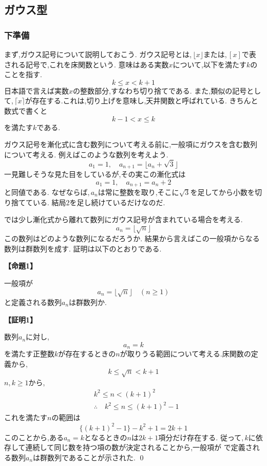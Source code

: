 \subsection{ガウス型}
  \subsubsection{下準備}
    まず,ガウス記号について説明しておこう.
    ガウス記号とは,\,$\lfloor x \rfloor$または,\,$[x]$で表される記号で,これを床関数という.
    意味はある実数$x$について,以下を満たす$k$のことを指す.
    \[
      k \le x < k+1
    \]
    日本語で言えば実数$x$の整数部分,すなわち切り捨てである.
    また,類似の記号として,\,$\lceil x \rceil$が存在する.これは,切り上げを意味し,天井関数と呼ばれている.
    きちんと数式で書くと
    \[
      k-1 < x \le k
    \]
    を満たす$k$である.

    ガウス記号を漸化式に含む数列について考える前に,一般項にガウスを含む数列について考える.
    例えばこのような数列を考えよう.
    \[
      a_1=1,\quad a_{n+1}=\lfloor a_n+\sqrt{3} \rfloor
    \]
    一見難しそうな見た目をしているが,その実この漸化式は
    \[
      a_1=1,\quad a_{n+1}=a_n+2
    \]
    と同値である.
    なぜならば,\,$a_n$は常に整数を取り,そこに$\sqrt{3}$を足してから小数を切り捨てている.
    結局2を足し続けているだけなのだ.

    では少し漸化式から離れて数列にガウス記号が含まれている場合を考える.
    \[
      a_{n}=\lfloor \sqrt{n} \rfloor
    \]
    この数列はどのような数列になるだろうか.
    結果から言えばこの一般項からなる数列は群数列を成す.
    証明は以下のとおりである.

    \noindent \textbf{【命題1】}
    \begin{smallquote}
      一般項が
      \[
        a_n=\lfloor \sqrt{n} \rfloor\quad(n\ge1)
      \]
      と定義される数列$a_n$は群数列か.
    \end{smallquote}
    \noindent \textbf{【証明1】}
    \begin{smallquote}
      数列$a_n$に対し,
      \[
        a_n=k
      \]
      を満たす正整数$k$が存在するときの$n$が取りうる範囲について考える.床関数の定義から,
      \[
        k\le\sqrt{n}<k+1
      \]
      $n,k\ge1$から,
      \begin{align*}
          & k^2\le n <(k+1)^2                      \\
          & \therefore\quad k^2\le n \le (k+1)^2-1
      \end{align*}
      これを満たす$n$の範囲は
      \[
        \{(k+1)^2-1\}-k^2+1=2k+1
      \]
      このことから,ある$a_n=k$となるときの$n$は$2k+1$項分だけ存在する.
      従って,\,$k$に依存して連続して同じ数を持つ項の数が決定されることから,一般項が
      で定義される数列$a_n$は群数列であることが示された. \qed
    \end{smallquote}

